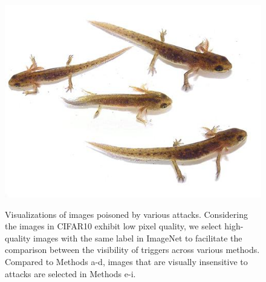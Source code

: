 \documentclass{article}
\begin{document}
\begin{figure}[h]
{\includegraphics[width=0.2\linewidth]{Styles/figures/2_Q24_48_8.jpeg}}
\caption{Visualizations of images poisoned by various attacks. Considering the images in CIFAR10 exhibit low pixel quality, we select high-quality images with the same label in ImageNet to facilitate the comparison between the visibility of triggers across various methods. Compared to Methods a-d, images that are visually insensitive to attacks are selected in Methods e-i.} 
\end{figure}
\end{document}
